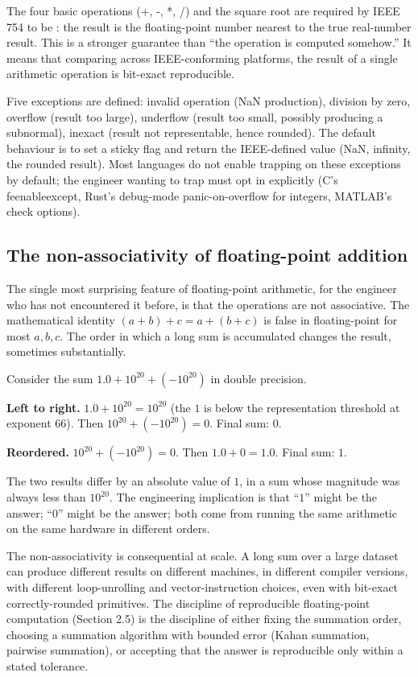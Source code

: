 The four basic operations (+, -, *, /) and the square root are required by IEEE 754 to be : the result is the floating-point number nearest to the true real-number result. This is a stronger guarantee than ``the operation is computed somehow.'' It means that comparing across IEEE-conforming platforms, the result of a single arithmetic operation is bit-exact reproducible.

Five exceptions are defined: invalid operation (NaN production), division by zero, overflow (result too large), underflow (result too small, possibly producing a subnormal), inexact (result not representable, hence rounded). The default behaviour is to set a sticky flag and return the IEEE-defined value (NaN, infinity, the rounded result). Most languages do not enable trapping on these exceptions by default; the engineer wanting to trap must opt in explicitly (C's feenableexcept, Rust's debug-mode panic-on-overflow for integers, MATLAB's check options).

\subsection{The non-associativity of floating-point addition}

The single most surprising feature of floating-point arithmetic, for the engineer who has not encountered it before, is that the operations are not associative. The mathematical identity $(a + b) + c = a + (b + c)$ is false in floating-point for most $a, b, c$. The order in which a long sum is accumulated changes the result, sometimes substantially.

\begin{example}
Consider the sum $1.0 + 10^{20} + (-10^{20})$ in double precision.

\textbf{Left to right.} $1.0 + 10^{20} = 10^{20}$ (the $1$ is below the representation threshold at exponent $66$). Then $10^{20} + (-10^{20}) = 0$. Final sum: $0$.

\textbf{Reordered.} $10^{20} + (-10^{20}) = 0$. Then $1.0 + 0 = 1.0$. Final sum: $1$.

The two results differ by an absolute value of $1$, in a sum whose magnitude was always less than $10^{20}$. The engineering implication is that ``$1$'' might be the answer; ``$0$'' might be the answer; both come from running the same arithmetic on the same hardware in different orders.
\end{example}

The non-associativity is consequential at scale. A long sum over a large dataset can produce different results on different machines, in different compiler versions, with different loop-unrolling and vector-instruction choices, even with bit-exact correctly-rounded primitives. The discipline of reproducible floating-point computation (Section 2.5) is the discipline of either fixing the summation order, choosing a summation algorithm with bounded error (Kahan summation, pairwise summation), or accepting that the answer is reproducible only within a stated tolerance.

